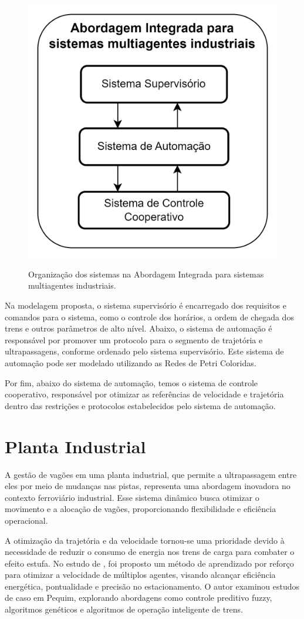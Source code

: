 \begin{figure}[ht]
\centering
\caption{Organização dos sistemas na Abordagem Integrada para sistemas multiagentes industriais.}
\includegraphics[width=0.5\linewidth]{figures/Simulation/Planta/topologia_integrada.png}
\label{fig:topologia_integrada}
\end{figure}

Na modelagem proposta, o sistema supervisório é encarregado dos requisitos e comandos para o sistema, como o controle dos horários, a ordem de chegada dos trens e outros parâmetros de alto nível. Abaixo, o sistema de automação é responsável por promover um protocolo para o segmento de trajetória e ultrapassagens, conforme ordenado pelo sistema supervisório. Este sistema de automação pode ser modelado utilizando as Redes de Petri Coloridas.

Por fim, abaixo do sistema de automação, temos o sistema de controle cooperativo, responsável por otimizar as referências de velocidade e trajetória dentro das restrições e protocolos estabelecidos pelo sistema de automação.







\section{Planta Industrial}
A gestão de vagões em uma planta industrial, que permite a ultrapassagem entre eles por meio de mudanças nas pistas, representa uma abordagem inovadora no contexto ferroviário industrial. Esse sistema dinâmico busca otimizar o movimento e a alocação de vagões, proporcionando flexibilidade e eficiência operacional.

A otimização da trajetória e da velocidade tornou-se uma prioridade devido à necessidade de reduzir o consumo de energia nos trens de carga para combater o efeito estufa. No estudo de \cite{train2023}, foi proposto um método de aprendizado por reforço para otimizar a velocidade de múltiplos agentes, visando alcançar eficiência energética, pontualidade e precisão no estacionamento. O autor examinou estudos de caso em Pequim, explorando abordagens como controle preditivo fuzzy, algoritmos genéticos e algoritmos de operação inteligente de trens.

